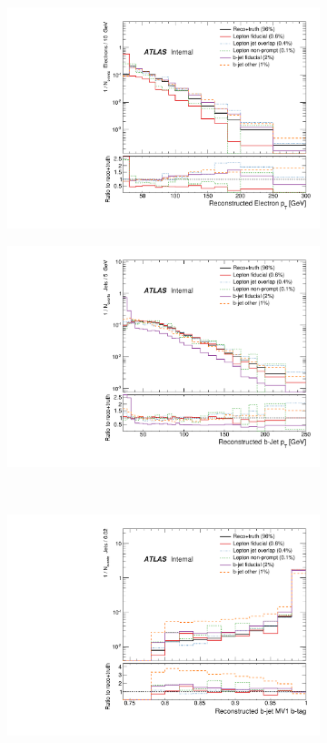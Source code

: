 \begin{figure}
\centering
\begin{subfigure}[]{0.45\textwidth}
\includegraphics[width=\textwidth]{fig/RecoNotTruth/ElecPt.pdf}
\end{subfigure}
\begin{subfigure}[]{0.45\textwidth}
\includegraphics[width=\textwidth]{fig/RecoNotTruth/BJetPt.pdf}
\end{subfigure}
\\
\begin{subfigure}[]{0.45\textwidth}
\includegraphics[width=\textwidth]{fig/RecoNotTruth/BJetMV1.pdf}

\end{subfigure}
\end{figure}
